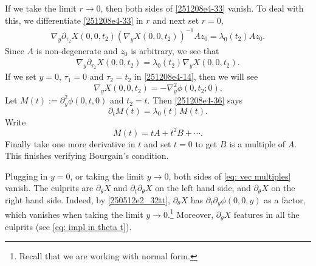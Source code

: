 \documentclass{article}
\numberwithin{equation}{section}
\theoremstyle{plain}
\begin{document}
If we take the limit $r\to 0$, then both sides of \eqref{251208e4-33} vanish. To deal with this, we differentiate \eqref{251208e4-33} in $r$ and next set $r=0$,
\begin{align}
    \nabla_y \partial_{\tau_2} X(0, 0, t_2)  
     (\nabla_y X(0, 0, t_2))^{-1} Az_0 = \lambda_0(t_2)Az_0.
\end{align}
Since $A$ is non-degenerate and $z_0$ is arbitrary, we see that
\begin{align}\label{251208e4-36}
    \nabla_y \partial_{\tau_2} X(0, 0, t_2)  
       = \lambda_0(t_2)\nabla_y X(0, 0, t_2).
\end{align}
If we set $y=0$, $\tau_1=0$ and $\tau_2=t_2$ in \eqref{251208e4-14}, then we will see
\begin{equation}
    \nabla_y X(0, 0, t_2)= -\nabla_y^2 \phi(0,t_2;0).
\end{equation}
Let $M(t) := \partial_y^2 \phi(0,t,0)$ and $t_2=t$. Then \eqref{251208e4-36} says
\begin{equation}
    \partial_t M(t)  
       = \lambda_0(t)M(t).
\end{equation}
Write 
\begin{equation}
M(t) = tA + t^2B + \cdots.
\end{equation}
 Finally take one more derivative in $t$ and set $t=0$ to get $B$ is a multiple of $A$. This finishes verifying Bourgain's condition. 


\iffalse


Plugging in $y = 0$, or taking the limit $y\to 0$, both sides of \eqref{eq: vec multiples} vanish. The culprits are $\partial_\theta X$ and $\partial_t \partial_\theta  X$ on the left hand side, and $\partial_\theta X$ on the right hand side. 
Indeed, by \eqref{250512e2_32tt}, 
$\partial_\theta X$ has $\partial_t \partial_y \phi(0,0,y)$ as a factor, which vanishes when taking the limit $y\to 0$.\footnote{Recall that we are working with normal form.} Moreover, $\partial_\theta X$ features in all the culprits (see \eqref{eq: impl in theta t}). \\
\end{document}
